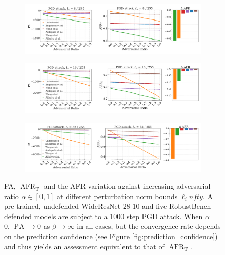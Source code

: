 \begin{figure}[H]
    \centering
    \begin{subfigure}[b]{\textwidth}
        \centering
        \includegraphics[width=\textwidth]{img/results_discussion/adversarial/PGD_0.0314_combo.png}
    \end{subfigure}

    \vspace{1em}

    \begin{subfigure}[b]{\textwidth}
        \centering
        \includegraphics[width=\textwidth]{img/results_discussion/adversarial/PGD_0.0627_combo.png}
    \end{subfigure}

    \vspace{1em}

    \begin{subfigure}[b]{\textwidth}
        \centering
        \includegraphics[width=\textwidth]{img/results_discussion/adversarial/PGD_0.1255_combo.png}
    \end{subfigure}

    \caption{PA, $\operatorname{AFR}_\text{T}$ and the AFR variation against increasing adversarial ratio $\alpha \in [0,1]$ at different
    perturbation norm bounds $\ell_infty$. A pre-trained, undefended WideResNet-28-10
    and five RobustBench %
    defended models are subject to a 1000 step PGD attack.
    When $\alpha$ = 0, $\operatorname{PA} \longrightarrow 0$ as $\beta \longrightarrow \infty$ in all cases, but
    the convergence rate depends on the prediction confidence (see Figure \ref{fig:prediction_confidence}) and thus yields an assessment equivalent to that
    of $\operatorname{AFR}_\text{T}$.
    }
    \label{fig:six_figures_pa_adv}
\end{figure}

